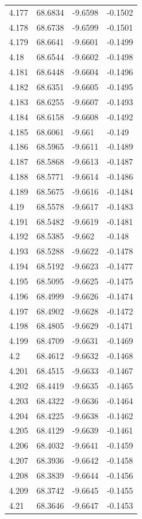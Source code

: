 \begin{tabular}{llll}
4.177 & 68.6834 & -9.6598 & -0.1502 \\
4.178 & 68.6738 & -9.6599 & -0.1501 \\
4.179 & 68.6641 & -9.6601 & -0.1499 \\
4.18 & 68.6544 & -9.6602 & -0.1498 \\
4.181 & 68.6448 & -9.6604 & -0.1496 \\
4.182 & 68.6351 & -9.6605 & -0.1495 \\
4.183 & 68.6255 & -9.6607 & -0.1493 \\
4.184 & 68.6158 & -9.6608 & -0.1492 \\
4.185 & 68.6061 & -9.661 & -0.149 \\
4.186 & 68.5965 & -9.6611 & -0.1489 \\
4.187 & 68.5868 & -9.6613 & -0.1487 \\
4.188 & 68.5771 & -9.6614 & -0.1486 \\
4.189 & 68.5675 & -9.6616 & -0.1484 \\
4.19 & 68.5578 & -9.6617 & -0.1483 \\
4.191 & 68.5482 & -9.6619 & -0.1481 \\
4.192 & 68.5385 & -9.662 & -0.148 \\
4.193 & 68.5288 & -9.6622 & -0.1478 \\
4.194 & 68.5192 & -9.6623 & -0.1477 \\
4.195 & 68.5095 & -9.6625 & -0.1475 \\
4.196 & 68.4999 & -9.6626 & -0.1474 \\
4.197 & 68.4902 & -9.6628 & -0.1472 \\
4.198 & 68.4805 & -9.6629 & -0.1471 \\
4.199 & 68.4709 & -9.6631 & -0.1469 \\
4.2 & 68.4612 & -9.6632 & -0.1468 \\
4.201 & 68.4515 & -9.6633 & -0.1467 \\
4.202 & 68.4419 & -9.6635 & -0.1465 \\
4.203 & 68.4322 & -9.6636 & -0.1464 \\
4.204 & 68.4225 & -9.6638 & -0.1462 \\
4.205 & 68.4129 & -9.6639 & -0.1461 \\
4.206 & 68.4032 & -9.6641 & -0.1459 \\
4.207 & 68.3936 & -9.6642 & -0.1458 \\
4.208 & 68.3839 & -9.6644 & -0.1456 \\
4.209 & 68.3742 & -9.6645 & -0.1455 \\
4.21 & 68.3646 & -9.6647 & -0.1453 \\

\end{tabular}
